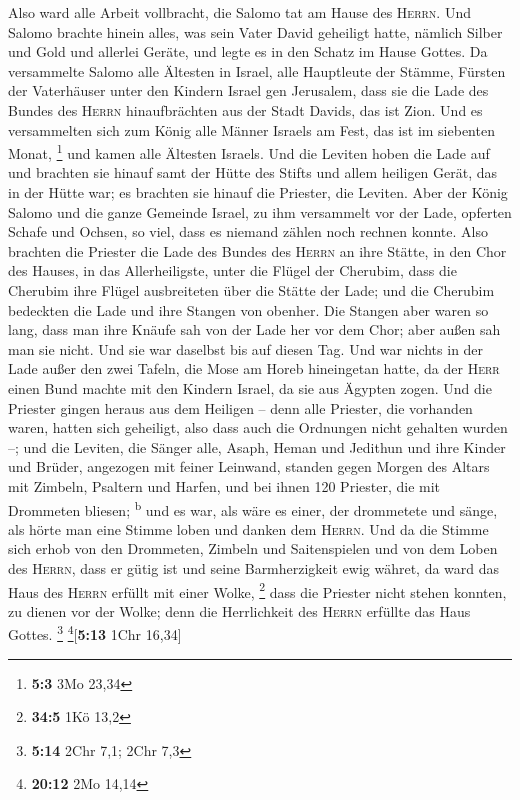  Also ward alle Arbeit vollbracht, die Salomo tat am Hause
des \textsc{Herrn}. Und Salomo brachte hinein alles, was sein Vater
David geheiligt hatte, nämlich Silber und Gold und allerlei Geräte, und
legte es in den Schatz im Hause Gottes.  Da versammelte
Salomo alle Ältesten in Israel, alle Hauptleute der Stämme, Fürsten der
Vaterhäuser unter den Kindern Israel gen Jerusalem, dass sie die Lade
des Bundes des \textsc{Herrn} hinaufbrächten aus der Stadt Davids, das
ist Zion.  Und es versammelten sich zum König alle Männer
Israels am Fest, das ist im siebenten Monat, \footnote{\textbf{5:3} 3Mo
  23,34}  und kamen alle Ältesten Israels. Und die Leviten
hoben die Lade auf  und brachten sie hinauf samt der Hütte
des Stifts und allem heiligen Gerät, das in der Hütte war; es brachten
sie hinauf die Priester, die Leviten.  Aber der König
Salomo und die ganze Gemeinde Israel, zu ihm versammelt vor der Lade,
opferten Schafe und Ochsen, so viel, dass es niemand zählen noch rechnen
konnte.  Also brachten die Priester die Lade des Bundes
des \textsc{Herrn} an ihre Stätte, in den Chor des Hauses, in das
Allerheiligste, unter die Flügel der Cherubim,  dass die
Cherubim ihre Flügel ausbreiteten über die Stätte der Lade; und die
Cherubim bedeckten die Lade und ihre Stangen von obenher. 
Die Stangen aber waren so lang, dass man ihre Knäufe sah von der Lade
her vor dem Chor; aber außen sah man sie nicht. Und sie war daselbst bis
auf diesen Tag.  Und war nichts in der Lade außer den
zwei Tafeln, die Mose am Horeb hineingetan hatte, da der \textsc{Herr}
einen Bund machte mit den Kindern Israel, da sie aus Ägypten zogen.
 Und die Priester gingen heraus aus dem Heiligen -- denn
alle Priester, die vorhanden waren, hatten sich geheiligt, also dass
auch die Ordnungen nicht gehalten wurden --;  und die
Leviten, die Sänger alle, Asaph, Heman und Jedithun und ihre Kinder und
Brüder, angezogen mit feiner Leinwand, standen gegen Morgen des Altars
mit Zimbeln, Psaltern und Harfen, und bei ihnen 120 Priester, die mit
Drommeten bliesen; \textsuperscript{b}  und es war, als
wäre es einer, der drommetete und sänge, als hörte man eine Stimme loben
und danken dem \textsc{Herrn}. Und da die Stimme sich erhob von den
Drommeten, Zimbeln und Saitenspielen und von dem Loben des
\textsc{Herrn}, dass er gütig ist und seine Barmherzigkeit ewig währet,
da ward das Haus des \textsc{Herrn} erfüllt mit einer Wolke, \footnote{\textbf{34:5}
  1Kö 13,2}  dass die Priester nicht stehen konnten, zu
dienen vor der Wolke; denn die Herrlichkeit des \textsc{Herrn} erfüllte
das Haus Gottes. \footnote{\textbf{5:14} 2Chr 7,1; 2Chr 7,3}
\footnote{\textbf{20:12} 2Mo 14,14}{[}\textbf{5:13} 1Chr 16,34{]}

